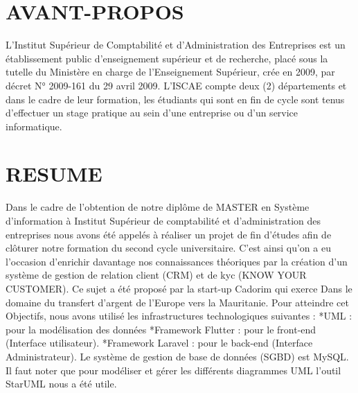 \documentclass[a4paper, 12pt]{report}
\begin{document}
	 \chapter*{AVANT-PROPOS} \label{chap:1AVANT-PROPOS}
	L’Institut Supérieur de Comptabilité et d’Administration des Entreprises est un établissement public d’enseignement supérieur et de recherche, placé sous la tutelle du Ministère en charge de l’Enseignement Supérieur, crée en 2009, par décret N° 2009-161 du 29 avril 2009.
	\newline
	L’ISCAE compte deux (2) départements et dans le cadre de leur formation, les étudiants qui sont en fin de cycle sont tenus d’effectuer un stage pratique au sein d’une entreprise ou d’un service informatique.
	\thispagestyle{empty}
	\chapter*{RESUME} \label{chap:1Resumé}
	Dans le cadre de l’obtention de notre diplôme de MASTER en Système d’information
	à Institut Supérieur de comptabilité et d’administration des entreprises nous avons été
	appelés à réaliser un projet de fin d’études afin de clôturer notre formation du second cycle
	universitaire. C’est ainsi qu’on a eu l’occasion d’enrichir davantage nos connaissances
	théoriques par la création d’un système de gestion de relation client (CRM) et de kyc
	 (KNOW YOUR CUSTOMER). Ce sujet a été proposé par la start-up Cadorim qui exerce
	 Dans le domaine du transfert d’argent de l’Europe vers la Mauritanie. Pour atteindre cet
	 Objectifs, nous avons utilisé les infrastructures technologiques suivantes : *UML : pour la
	 modélisation des données *Framework Flutter : pour le front-end (Interface utilisateur).
	 *Framework Laravel : pour le back-end (Interface Administrateur).
	Le système de gestion de base de données (SGBD) est MySQL.
	Il faut noter que pour modéliser et gérer les différents diagrammes UML l'outil
	StarUML nous a été utile.
	
	\thispagestyle{empty}
\end{document}
